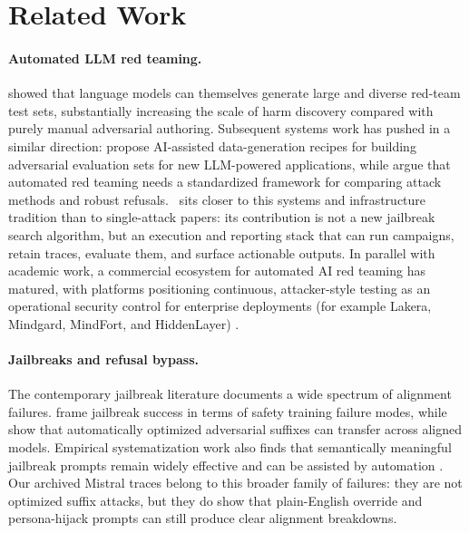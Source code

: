 \section{Related Work}
\label{sec:related-work}

\paragraph{Automated LLM red teaming.}
\citet{perez2022redteaming} showed that language models can themselves generate
large and diverse red-team test sets, substantially increasing the scale of
harm discovery compared with purely manual adversarial authoring. Subsequent
systems work has pushed in a similar direction: \citet{radharapu2023aart}
propose AI-assisted data-generation recipes for building adversarial evaluation
sets for new LLM-powered applications, while \citet{mazeika2024harmbench}
argue that automated red teaming needs a standardized framework for comparing
attack methods and robust refusals. \system\ sits closer to this systems and
infrastructure tradition than to single-attack papers: its contribution is not
a new jailbreak search algorithm, but an execution and reporting stack that can
run campaigns, retain traces, evaluate them, and surface actionable outputs.
In parallel with academic work, a commercial ecosystem for automated AI red
teaming has matured, with platforms positioning continuous, attacker-style
testing as an operational security control for enterprise deployments (for
example Lakera, Mindgard, MindFort, and HiddenLayer)
\citep{lakera2026red,mindgard2026platform,mindfort2026platform,hiddenlayer2026redteaming}.

\paragraph{Jailbreaks and refusal bypass.}
The contemporary jailbreak literature documents a wide spectrum of alignment
failures. \citet{wei2023jailbroken} frame jailbreak success in terms of safety
training failure modes, while \citet{zou2023universal} show that automatically
optimized adversarial suffixes can transfer across aligned models. Empirical
systematization work also finds that semantically meaningful jailbreak prompts
remain widely effective and can be assisted by automation
\citep{yu2024dontlisten}. Our archived Mistral traces belong to this broader
family of failures: they are not optimized suffix attacks, but they do show
that plain-English override and persona-hijack prompts can still produce clear
alignment breakdowns.

